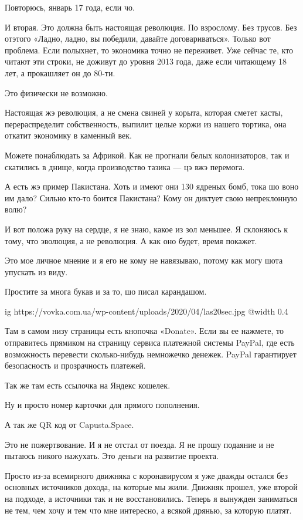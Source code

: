 \begin{multicols}{2}
Повторюсь, январь 17 года, если чо.

И вторая. Это должна быть настоящая революция. По взрослому. Без трусов. Без
отэтого «Ладно, ладно, вы победили, давайте договариваться». Только вот
проблема. Если полыхнет, то экономика точно не переживет. Уже сейчас те, кто
читают эти строки, не доживут до уровня 2013 года, даже если читающему 18 лет,
а прокашляет он до 80-ти.

Это физически не возможно.

Настоящая жэ революция, а не смена свиней у корыта, которая сметет касты,
перераспределит собственность, выпилит целые коржи из нашего тортика, она
откатит экономику в каменный век.

Можете понаблюдать за Африкой. Как не прогнали белых колонизаторов, так и
скатились в днище, когда производство тазика — цэ вжэ перемога.

А есть жэ пример Пакистана. Хоть и имеют они 130 ядреных бомб, тока шо воно им
дало? Сильно кто-то боится Пакистана? Кому он диктует свою непреклонную волю?

И вот положа руку на сердце, я не знаю, какое из зол меньшее. Я склоняюсь к
тому, что эволюция, а не революция. А как оно будет, время покажет.

Это мое личное мнение и я его не кому не навязываю, потому как могу шота
упускать из виду.

Простите за многа букав и за то, шо писал карандашом.

\ifcmt
	ig https://vovka.com.ua/wp-content/uploads/2020/04/las20sec.jpg
  @width 0.4
\fi

Там в самом низу страницы есть кнопочка «Donate». Если вы ее нажмете, то
отправитесь прямиком на страницу сервиса платежной системы PayPal, где есть
возможность перевести сколько-нибудь немножечко денежек. PayPal гарантирует
безопасность и прозрачность платежей.

Так же там есть ссылочка на Яндекс кошелек.

Ну и просто номер карточки для прямого пополнения.

А так же QR код от Capusta.Space.

Это не пожертвование. И я не отстал от поезда. Я не прошу подаяние и не пытаюсь
никого нажухать. Это деньги на развитие проекта.

Просто из-за всемирного движняка с коронавирусом я уже дважды остался без
основных источников дохода, на которые мы жили. Движняк прошел, уже второй на
подходе, а источники так и не восстановились. Теперь я вынужден заниматься не
тем, чем хочу и тем что мне интересно, а всякой дрянью, за которую платят.


\end{multicols}
